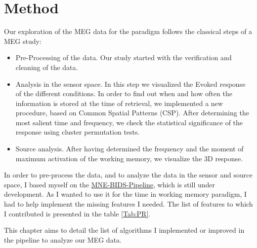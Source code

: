 \chapter{Method}




Our exploration of the MEG data for the paradigm follows the classical steps of a MEG study:

\begin{itemize}
    \item Pre-Processing of the data. Our study started with the verification and cleaning of the data.
    \item Analysis in the sensor space. In this step we visualized the Evoked response of the different conditions. In order to find out when and how often the information is stored at the time of retrieval, we implemented a new procedure, based on Common Spatial Patterns (CSP). After determining the most salient time and frequency, we check the statistical significance of the response using cluster permutation tests.
    \item Source analysis. After having determined the frequency and the moment of maximum activation of the working memory, we visualize the 3D response.
\end{itemize}

In order to pre-process the data, and to analyze the data in the sensor and source space, I based myself on the \href{https://github.com/mne-tools/mne-bids-pipeline}{MNE-BIDS-Pipeline}, which is still under development. As I wanted to use it for the time in working memory paradigm, I had to help implement the missing features I needed. The list of features to which I contributed is presented in the table \ref{Tab:PR}.

This chapter aims to detail the list of algorithms I implemented or improved in the pipeline to analyze our MEG data.

